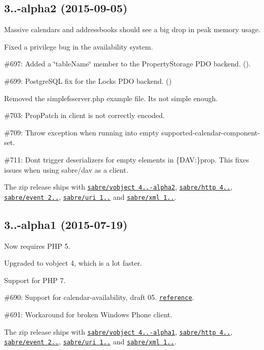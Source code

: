 \subsection*{3..-\/alpha2 (2015-\/09-\/05) }


\begin{DoxyItemize}
\item Massive calendars and addressbooks should see a big drop in peak memory usage.
\item Fixed a privilege bug in the availability system.
\item \#697\+: Added a \char`\"{}table\+Name\char`\"{} member to the Property\+Storage P\+DO backend. ().
\item \#699\+: Postgre\+S\+QL fix for the Locks P\+DO backend. ()
\item Removed the {\ttfamily simplefsserver.\+php} example file. It\textquotesingle{}s not simple enough.
\item \#703\+: Prop\+Patch in client is not correctly encoded.
\item \#709\+: Throw exception when running into empty {\ttfamily supported-\/calendar-\/component-\/set}.
\item \#711\+: Don\textquotesingle{}t trigger deserializers for empty elements in {\ttfamily \{D\+AV\+:\}prop}. This fixes issues when using sabre/dav as a client.
\item The zip release ships with \href{http://sabre.io/vobject/}{\tt sabre/vobject 4..-\/alpha2}, \href{http://sabre.io/http/}{\tt sabre/http 4..}, \href{http://sabre.io/event/}{\tt sabre/event 2..}, \href{http://sabre.io/uri/}{\tt sabre/uri 1..} and \href{http://sabre.io/xml/}{\tt sabre/xml 1..}.
\end{DoxyItemize}

\subsection*{3..-\/alpha1 (2015-\/07-\/19) }


\begin{DoxyItemize}
\item Now requires P\+HP 5.
\item Upgraded to vobject 4, which is a lot faster.
\item Support for P\+HP 7.
\item \#690\+: Support for {\ttfamily calendar-\/availability}, draft 05. \href{https://tools.ietf.org/html/draft-daboo-calendar-availability-05}{\tt reference}.
\item \#691\+: Workaround for broken Windows Phone client.
\item The zip release ships with \href{http://sabre.io/vobject/}{\tt sabre/vobject 4..-\/alpha1}, \href{http://sabre.io/http/}{\tt sabre/http 4..}, \href{http://sabre.io/event/}{\tt sabre/event 2..}, \href{http://sabre.io/uri/}{\tt sabre/uri 1..} and \href{http://sabre.io/xml/}{\tt sabre/xml 1..}.
\end{DoxyItemize}

